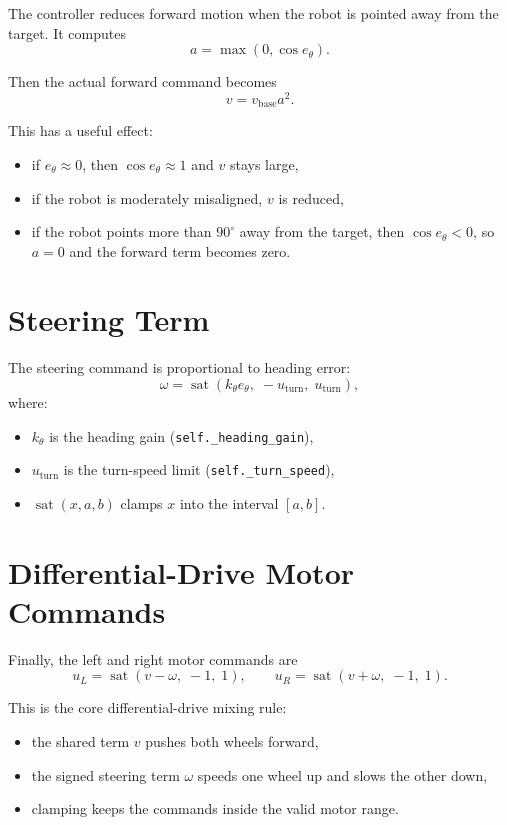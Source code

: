 \documentclass[11pt]{article}
\begin{document}
The controller reduces forward motion when the robot is pointed away from the
target. It computes
\[
a = \max(0, \cos e_\theta).
\]

Then the actual forward command becomes
\[
v = v_{\text{base}} a^2.
\]

This has a useful effect:
\begin{itemize}
\item if $e_\theta \approx 0$, then $\cos e_\theta \approx 1$ and $v$ stays large,
\item if the robot is moderately misaligned, $v$ is reduced,
\item if the robot points more than $90^\circ$ away from the target, then
$\cos e_\theta < 0$, so $a = 0$ and the forward term becomes zero.
\end{itemize}

\section{Steering Term}

The steering command is proportional to heading error:
\[
\omega = \operatorname{sat}\!\left(k_\theta e_\theta,\; -u_{\text{turn}},\; u_{\text{turn}}\right),
\]
where:
\begin{itemize}
\item $k_\theta$ is the heading gain (\texttt{self.\_heading\_gain}),
\item $u_{\text{turn}}$ is the turn-speed limit (\texttt{self.\_turn\_speed}),
\item $\operatorname{sat}(x, a, b)$ clamps $x$ into the interval $[a,b]$.
\end{itemize}

\section{Differential-Drive Motor Commands}

Finally, the left and right motor commands are
\[
u_L = \operatorname{sat}(v - \omega,\; -1,\; 1),
\qquad
u_R = \operatorname{sat}(v + \omega,\; -1,\; 1).
\]

This is the core differential-drive mixing rule:
\begin{itemize}
\item the shared term $v$ pushes both wheels forward,
\item the signed steering term $\omega$ speeds one wheel up and slows the other down,
\item clamping keeps the commands inside the valid motor range.
\end{itemize}
\end{document}
